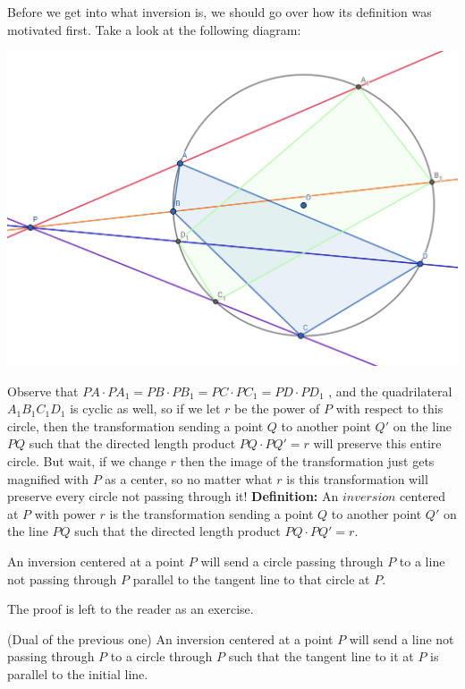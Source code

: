 \documentclass{scrartcl}
\begin{document}
Before we get into what inversion is, we should go over how its definition was motivated first. Take a look at the following diagram:
\begin{center}
\includegraphics[scale=0.2]{pop.jpeg}
\end{center}
Observe that $PA \cdot PA_1 = PB \cdot PB_1 = PC \cdot PC_1 = PD \cdot PD_1$ , and the quadrilateral $A_1 B_1 C_1 D_1$ is cyclic as well, so if we let $r$ be the power of $P$ with respect to this circle, then the transformation sending a point $Q$ to another point $Q'$ on the line $PQ$ such that the directed length product $PQ \cdot PQ' = r$ will preserve this entire circle. But wait, if we change $r$ then the image of the transformation just gets magnified with $P$ as a center, so no matter what $r$ is this transformation will preserve every circle not passing through it! \newline \newline
\textbf{Definition:} An $inversion$ centered at $P$ with power $r$ is the transformation sending a point $Q$ to another point $Q'$ on the line $PQ$ such that the directed length product $PQ \cdot PQ' = r$. \newline
\begin{theorem}
An inversion centered at a point $P$ will send a circle passing through $P$ to a line not passing through $P$ parallel to the tangent line to that circle at $P$. 
\end{theorem}
The proof is left to the reader as an exercise.
\begin{theorem}
(Dual of the previous one) An inversion centered at a point $P$ will send a line not passing through $P$ to a circle through $P$ such that the tangent line to it at $P$ is parallel to the initial line.
\end{theorem}
\end{document}

